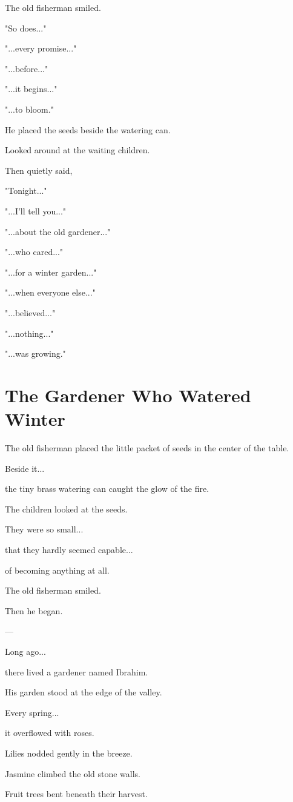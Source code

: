 \documentclass[12pt,openany]{book}
\begin{document}
The old fisherman smiled.

"So does..."

"...every promise..."

"...before..."

"...it begins..."

"...to bloom."

He placed the seeds beside the watering can.

Looked around at the waiting children.

Then quietly said,

"Tonight..."

"...I'll tell you..."

"...about the old gardener..."

"...who cared..."

"...for a winter garden..."

"...when everyone else..."

"...believed..."

"...nothing..."

"...was growing."
\section*{The Gardener Who Watered Winter}

The old fisherman placed the little packet of seeds in the center of the table.

Beside it...

the tiny brass watering can caught the glow of the fire.

The children looked at the seeds.

They were so small...

that they hardly seemed capable...

of becoming anything at all.

The old fisherman smiled.

Then he began.

---

Long ago...

there lived a gardener named Ibrahim.

His garden stood at the edge of the valley.

Every spring...

it overflowed with roses.

Lilies nodded gently in the breeze.

Jasmine climbed the old stone walls.

Fruit trees bent beneath their harvest.
\end{document}
